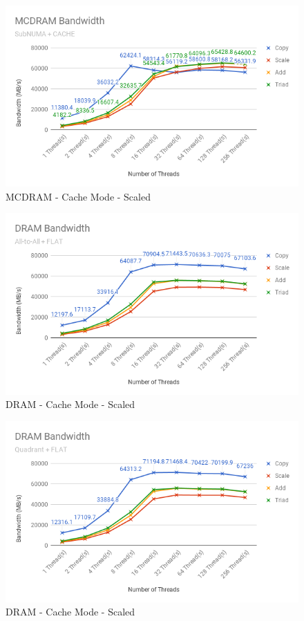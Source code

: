 \documentclass[bsc,frontabs,twoside,singlespacing,parskip,deptreport]{infthesis}     %
\begin{document}
\begin{figure}[!h]
    \centering
    \includegraphics[width=\textwidth]{Results/mcdram_snc4_c_scaled.png}
    \caption{MCDRAM - Cache Mode - Scaled}
    \label{res:mcdram-snc4-c-scaled}
\end{figure}

\begin{figure}[!h]
    \centering
    \includegraphics[width=\textwidth]{Results/dram_a2a_f_scaled.png}
    \caption{DRAM - Cache Mode - Scaled}
    \label{res:dram-a2a-f-scaled}
\end{figure}

\begin{figure}[!h]
    \centering
    \includegraphics[width=\textwidth]{Results/dram_quad_f_scaled.png}
    \caption{DRAM - Cache Mode - Scaled}
    \label{res:dram-quad-f-scaled}
\end{figure}
\end{document}
